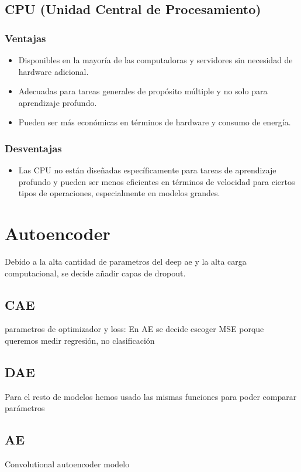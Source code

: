 \subsection{CPU (Unidad Central de Procesamiento)}

\subsubsection{Ventajas}
\begin{itemize}
    \item Disponibles en la mayoría de las computadoras y servidores sin necesidad de hardware adicional.
    \item Adecuadas para tareas generales de propósito múltiple y no solo para aprendizaje profundo.
    \item Pueden ser más económicas en términos de hardware y consumo de energía.
\end{itemize}

\subsubsection{Desventajas}
\begin{itemize}
    \item Las CPU no están diseñadas específicamente para tareas de aprendizaje profundo y pueden ser menos eficientes en términos de velocidad para ciertos tipos de operaciones, especialmente en modelos grandes.
\end{itemize}

\section{Autoencoder} \label{sec: 3.AE}
Debido a la alta cantidad de parametros del deep ae y la alta carga computacional, se decide añadir capas de dropout.

\subsection{CAE}
parametros de optimizador y loss: \citep{guo2017deep}
En AE se decide escoger MSE porque queremos medir regresión, no clasificación
\subsection{DAE}
Para el resto de modelos hemos usado las mismas funciones para poder comparar parámetros
\subsection{AE}
Convolutional autoencoder modelo \citep{xing2022malware}
